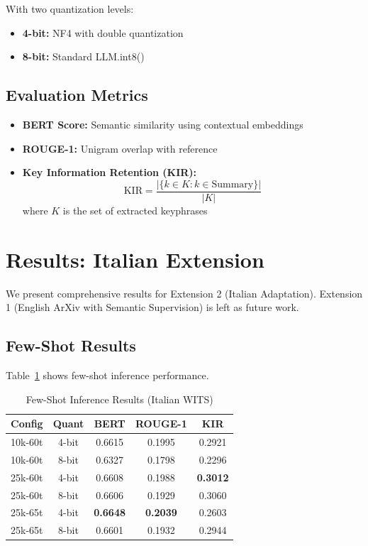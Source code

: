 \documentclass[conference]{IEEEtran}
\begin{document}
With two quantization levels:
\begin{itemize}
    \item \textbf{4-bit:} NF4 with double quantization
    \item \textbf{8-bit:} Standard LLM.int8()
\end{itemize}

\subsection{Evaluation Metrics}

\begin{itemize}
    \item \textbf{BERT Score:} Semantic similarity using contextual embeddings
    \item \textbf{ROUGE-1:} Unigram overlap with reference
    \item \textbf{Key Information Retention (KIR):}
    \begin{equation}
    \text{KIR} = \frac{|\{k \in K : k \in \text{Summary}\}|}{|K|}
    \label{eq:kir}
    \end{equation}
    where $K$ is the set of extracted keyphrases
\end{itemize}

\section{Results: Italian Extension}

We present comprehensive results for Extension 2 (Italian Adaptation). Extension 1 (English ArXiv with Semantic Supervision) is left as future work.

\subsection{Few-Shot Results}

Table~\ref{tab:few_shot} shows few-shot inference performance.

\begin{table}[htbp]
\caption{Few-Shot Inference Results (Italian WITS)}
\begin{center}
\begin{tabular}{lcccc}
\toprule
\textbf{Config} & \textbf{Quant} & \textbf{BERT} & \textbf{ROUGE-1} & \textbf{KIR} \\
\midrule
10k-60t & 4-bit & 0.6615 & 0.1995 & 0.2921 \\
10k-60t & 8-bit & 0.6327 & 0.1798 & 0.2296 \\
25k-60t & 4-bit & 0.6608 & 0.1988 & \textbf{0.3012} \\
25k-60t & 8-bit & 0.6606 & 0.1929 & 0.3060 \\
25k-65t & 4-bit & \textbf{0.6648} & \textbf{0.2039} & 0.2603 \\
25k-65t & 8-bit & 0.6601 & 0.1932 & 0.2944 \\
\bottomrule
\end{tabular}
\label{tab:few_shot}
\end{center}
\end{table}
\end{document}
